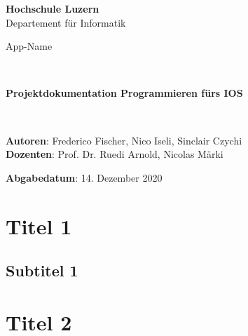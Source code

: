 \documentclass[12pt,titlepage]{article}
\begin{document}
\thispagestyle{empty}

\begin{center}
\textbf{Hochschule Luzern}\\
Departement für Informatik\\[12\baselineskip]

\begin{Huge}
App-Name
\end{Huge} \\[6\baselineskip]

\begin{large}
\textbf{Projektdokumentation Programmieren fürs IOS}
\end{large} \\[6\baselineskip]

\begin{large}
\textbf{Autoren}: Frederico Fischer, Nico Iseli, Sinclair Czychi\\
\textbf{Dozenten}: Prof. Dr. Ruedi Arnold, Nicolas Märki\

\textbf{Abgabedatum}: 14. Dezember 2020 \\ 
\end{large}
\end{center}
\newpage


\section*{Titel 1}

\subsection*{Subtitel 1}

\section*{Titel 2}
\end{document}
